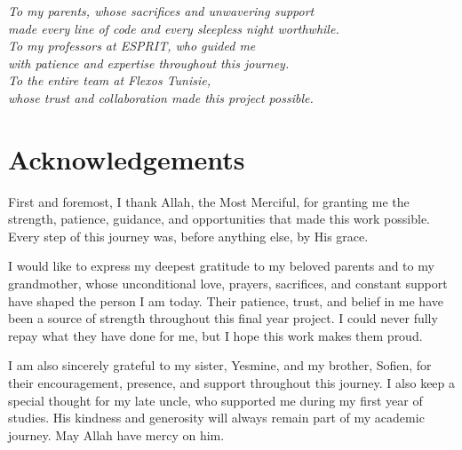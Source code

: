 \documentclass[12pt,a4paper]{report}
\begin{document}
\dominitoc


\newpage\thispagestyle{empty}
\vspace*{5cm}
\begin{center}
{\large\itshape\color{espritgray}
To my parents, whose sacrifices and unwavering support\\
made every line of code and every sleepless night worthwhile.\\[0.5cm]
To my professors at ESPRIT, who guided me\\
with patience and expertise throughout this journey.\\[0.5cm]
To the entire team at Flexos Tunisie,\\
whose trust and collaboration made this project possible.
}
\end{center}
\vfill

\newpage\thispagestyle{empty}
\chapter*{Acknowledgements}

First and foremost, I thank Allah, the Most Merciful, for granting me the strength, patience, guidance, and opportunities that made this work possible. Every step of this journey was, before anything else, by His grace.

I would like to express my deepest gratitude to my beloved parents and to my grandmother, whose unconditional love, prayers, sacrifices, and constant support have shaped the person I am today. Their patience, trust, and belief in me have been a source of strength throughout this final year project. I could never fully repay what they have done for me, but I hope this work makes them proud.

I am also sincerely grateful to my sister, Yesmine, and my brother, Sofien, for their encouragement, presence, and support throughout this journey. I also keep a special thought for my late uncle, who supported me during my first year of studies. His kindness and generosity will always remain part of my academic journey. May Allah have mercy on him.
\end{document}

